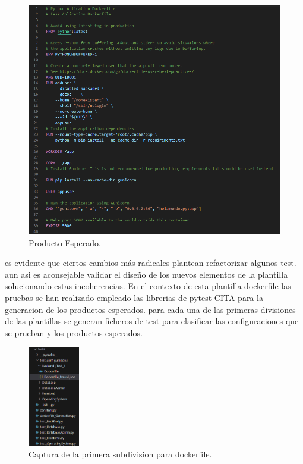 \documentclass[12pt, a4paper, twoside]{article}
\begin{document}
\begin{figure}[ht]
	\centering
	  \includegraphics[width=1\textwidth]{dockerfile.backend.producto.png}
	\caption{Producto Esperado.}
\end{figure}

\newpage

es evidente que ciertos cambios más radicales plantean refactorizar algunos test. aun asi es aconsejable validar el diseño de los nuevos elementos de la plantilla solucionando estas incoherencias.
En el contexto de esta plantilla dockerfile las pruebas se han realizado empleado las librerias de pytest CITA para la generacion de los productos esperados.
para cada una de las primeras divisiones de las plantillas se generan ficheros de test para clasificar las configuraciones que se prueban y los productos esperados.


\begin{figure}[ht]
	\centering
	  \includegraphics[width=0.2\textwidth]{organizacion.test.pytest.png}
	\caption{Captura de la primera subdivision para dockerfile.}
\end{figure}
\end{document}
